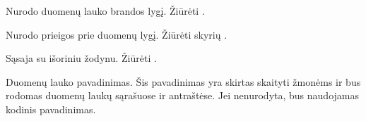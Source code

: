 \documentclass[letterpaper,10pt,lithuanian]{sphinxmanual}
\begin{document}

\begin{fulllineitems}
\label{\detokenize{dimensijos:property.level}}
\pysigstartsignatures
{}
\pysigstopsignatures
\sphinxAtStartPar
Nurodo duomenų lauko brandos lygį. Žiūrėti {\hyperref[\detokenize{branda:level}]{}}.

\end{fulllineitems}


\begin{fulllineitems}
\label{\detokenize{dimensijos:property.access}}
\pysigstartsignatures
{}
\pysigstopsignatures
\sphinxAtStartPar
Nurodo prieigos prie duomenų lygį. Žiūrėti skyrių {\hyperref[\detokenize{prieiga:access}]{}}.

\end{fulllineitems}


\begin{fulllineitems}
\label{\detokenize{dimensijos:property.uri}}
\pysigstartsignatures
{}
\pysigstopsignatures
\sphinxAtStartPar
Sąsaja su išoriniu žodynu. Žiūrėti {\hyperref[\detokenize{zodynai:vocab}]{}}.

\end{fulllineitems}


\begin{fulllineitems}
\label{\detokenize{dimensijos:property.title}}
\pysigstartsignatures
{}
\pysigstopsignatures
\sphinxAtStartPar
Duomenų lauko pavadinimas. Šis pavadinimas yra skirtas skaityti žmonėms
ir bus rodomas duomenų laukų sąrašuose ir antraštėse. Jei nenurodyta, bus
naudojamas {\hyperref[\detokenize{formatas:property}]{}} kodinis pavadinimas.

\end{fulllineitems}
\end{document}
